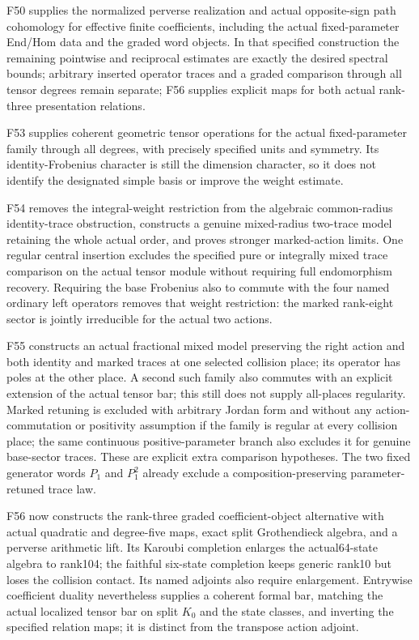 \documentclass[11pt,a4paper]{article}
\theoremstyle{named}\newtheorem{finding}{Finding}[section]
\theoremstyle{definition}\newtheorem{definition}[finding]{Definition}
\theoremstyle{remark}\newtheorem{remark}[finding]{Remark}
\begin{document}
F50 supplies the normalized perverse realization and actual opposite-sign path cohomology for effective finite coefficients, including the actual fixed-parameter End/Hom data and the graded word objects. In that specified construction the remaining pointwise and reciprocal estimates are exactly the desired spectral bounds; arbitrary inserted operator traces and a graded comparison through all tensor degrees remain separate; F56 supplies explicit maps for both actual rank-three presentation relations.

F53 supplies coherent geometric tensor operations for the actual fixed-parameter family through all degrees, with precisely specified units and symmetry. Its identity-Frobenius character is still the dimension character, so it does not identify the designated simple basis or improve the weight estimate.

F54 removes the integral-weight restriction from the algebraic common-radius identity-trace obstruction, constructs a genuine mixed-radius two-trace model retaining the whole actual order, and proves stronger marked-action limits. One regular central insertion excludes the specified pure or integrally mixed trace comparison on the actual tensor module without requiring full endomorphism recovery. Requiring the base Frobenius also to commute with the four named ordinary left operators removes that weight restriction: the marked rank-eight sector is jointly irreducible for the actual two actions.

F55 constructs an actual fractional mixed model preserving the right action and both identity and marked traces at one selected collision place; its operator has poles at the other place. A second such family also commutes with an explicit extension of the actual tensor bar; this still does not supply all-places regularity. Marked retuning is excluded with arbitrary Jordan form and without any action-commutation or positivity assumption if the family is regular at every collision place; the same continuous positive-parameter branch also excludes it for genuine base-sector traces. These are explicit extra comparison hypotheses. The two fixed generator words $P_1$ and $P_1^2$ already exclude a composition-preserving parameter-retuned trace law.

F56 now constructs the rank-three graded coefficient-object alternative with actual quadratic and degree-five maps, exact split Grothendieck algebra, and a perverse arithmetic lift. Its Karoubi completion enlarges the actual64-state algebra to rank104; the faithful six-state completion keeps generic rank10 but loses the collision contact. Its named adjoints also require enlargement. Entrywise coefficient duality nevertheless supplies a coherent formal bar, matching the actual localized tensor bar on split $K_0$ and the state classes, and inverting the specified relation maps; it is distinct from the transpose action adjoint.
\end{document}
